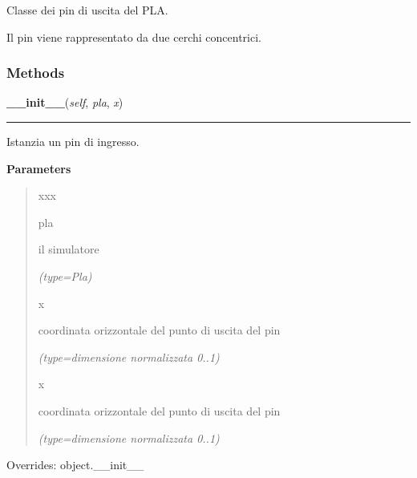 Classe dei pin di uscita del PLA.

Il pin viene rappresentato da due cerchi concentrici.



  \subsubsection{Methods}

    \vspace{0.5ex}

\hspace{.8\funcindent}\begin{boxedminipage}{\funcwidth}

    \raggedright \textbf{\_\_init\_\_}(\textit{self}, \textit{pla}, \textit{x})

    \vspace{-1.5ex}

    \rule{\textwidth}{0.5\fboxrule}
\setlength{\parskip}{2ex}
    Istanzia un pin di ingresso.

\setlength{\parskip}{1ex}
      \textbf{Parameters}
      \vspace{-1ex}

      \begin{quote}
        \begin{Ventry}{xxx}

          \item[pla]

          il simulatore

            {\it (type=Pla)}

          \item[x]

          coordinata orizzontale del punto di uscita del pin

            {\it (type=dimensione normalizzata 0..1)}

          \item[x]

          coordinata orizzontale del punto di uscita del pin

            {\it (type=dimensione normalizzata 0..1)}

        \end{Ventry}

      \end{quote}

      Overrides: object.\_\_init\_\_

    \end{boxedminipage}

